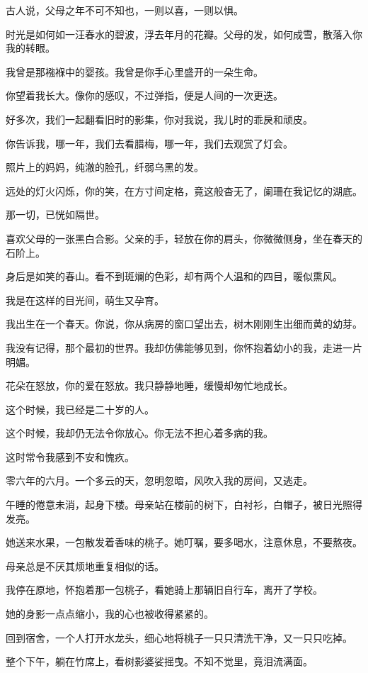 		\vspace{1em}
		古人说，父母之年不可不知也，一则以喜，一则以惧。\par
		时光是如何如一汪春水的碧波，浮去年月的花瓣。父母的发，如何成雪，散落入你我的转眼。\par
		我曾是那襁褓中的婴孩。我曾是你手心里盛开的一朵生命。\par
		你望着我长大。像你的感叹，不过弹指，便是人间的一次更迭。\par
		好多次，我们一起翻看旧时的影集，你对我说，我儿时的乖戾和顽皮。\par
		你告诉我，哪一年，我们去看腊梅，哪一年，我们去观赏了灯会。\par
		照片上的妈妈，纯澈的脸孔，纤弱乌黑的发。\par
		远处的灯火闪烁，你的笑，在方寸间定格，竟这般杳无了，阑珊在我记忆的湖底。\par
		那一切，已恍如隔世。\par
		喜欢父母的一张黑白合影。父亲的手，轻放在你的肩头，你微微侧身，坐在春天的石阶上。\par
		身后是如笑的春山。看不到斑斓的色彩，却有两个人温和的四目，暖似熏风。\par
		我是在这样的目光间，萌生又孕育。\par
		我出生在一个春天。你说，你从病房的窗口望出去，树木刚刚生出细而黄的幼芽。\par
		我没有记得，那个最初的世界。我却仿佛能够见到，你怀抱着幼小的我，走进一片明媚。\par
		花朵在怒放，你的爱在怒放。我只静静地睡，缓慢却匆忙地成长。

		\vspace{1em}
		这个时候，我已经是二十岁的人。\par
		这个时候，我却仍无法令你放心。你无法不担心着多病的我。\par
		这时常令我感到不安和愧疚。

		\vspace{1em}
		零六年的六月。一个多云的天，忽明忽暗，风吹入我的房间，又逃走。\par
		午睡的倦意未消，起身下楼。母亲站在楼前的树下，白衬衫，白帽子，被日光照得发亮。\par
		她送来水果，一包散发着香味的桃子。她叮嘱，要多喝水，注意休息，不要熬夜。\par
		母亲总是不厌其烦地重复相似的话。\par
		我停在原地，怀抱着那一包桃子，看她骑上那辆旧自行车，离开了学校。\par
		她的身影一点点缩小，我的心也被收得紧紧的。\par
		回到宿舍，一个人打开水龙头，细心地将桃子一只只清洗干净，又一只只吃掉。\par
		整个下午，躺在竹席上，看树影婆娑摇曳。不知不觉里，竟泪流满面。

